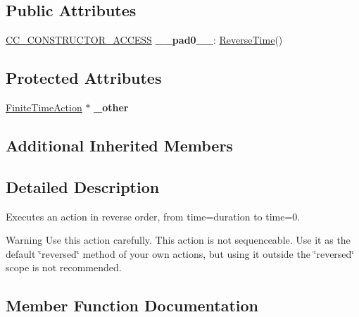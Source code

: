 \subsection*{Public Attributes}
\begin{DoxyCompactItemize}
\item 
\mbox{\label{classReverseTime_a8b41d82fa42a26331f90f02c51dc404f}} 
\hyperlink{_2cocos2d_2cocos_2base_2ccConfig_8h_a25ef1314f97c35a2ed3d029b0ead6da0}{C\+C\+\_\+\+C\+O\+N\+S\+T\+R\+U\+C\+T\+O\+R\+\_\+\+A\+C\+C\+E\+SS} {\bfseries \+\_\+\+\_\+pad0\+\_\+\+\_\+}\+: \hyperlink{classReverseTime}{Reverse\+Time}()
\end{DoxyCompactItemize}
\subsection*{Protected Attributes}
\begin{DoxyCompactItemize}
\item 
\mbox{\label{classReverseTime_aafbf17469d8716932c78d7bdbc1b0f97}} 
\hyperlink{classFiniteTimeAction}{Finite\+Time\+Action} $\ast$ {\bfseries \+\_\+other}
\end{DoxyCompactItemize}
\subsection*{Additional Inherited Members}


\subsection{Detailed Description}
Executes an action in reverse order, from time=duration to time=0. 

\begin{DoxyWarning}{Warning}
Use this action carefully. This action is not sequenceable. Use it as the default \char`\"{}reversed\char`\"{} method of your own actions, but using it outside the \char`\"{}reversed\char`\"{} scope is not recommended. 
\end{DoxyWarning}


\subsection{Member Function Documentation}
\mbox{\label{classReverseTime_a5bbbb233eb04b5392365ef294260e5db}} 
